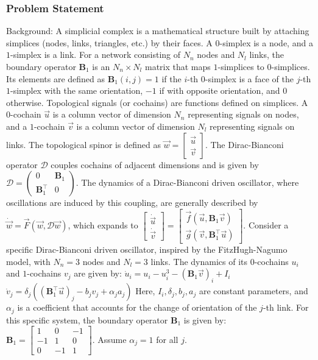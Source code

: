 \documentclass[10pt]{article}
\begin{document}
\subsubsection*{Problem Statement}
Background:
A simplicial complex is a mathematical structure built by attaching simplices (nodes, links, triangles, etc.) by their faces. A $0$-simplex is a node, and a $1$-simplex is a link. For a network consisting of $N_n$ nodes and $N_l$ links, the boundary operator $\mathbf{B}_1$ is an $N_n \times N_l$ matrix that maps $1$-simplices to $0$-simplices. Its elements are defined as $\mathbf{B}_1(i,j)=1$ if the $i$-th $0$-simplex is a face of the $j$-th $1$-simplex with the same orientation, $-1$ if with opposite orientation, and $0$ otherwise. Topological signals (or cochains) are functions defined on simplices. A $0$-cochain $\vec{u}$ is a column vector of dimension $N_n$ representing signals on nodes, and a $1$-cochain $\vec{v}$ is a column vector of dimension $N_l$ representing signals on links. The topological spinor is defined as $\vec{w}=\begin{bmatrix} \vec{u} \\ \vec{v} \end{bmatrix}$. The Dirac-Bianconi operator $\mathcal{D}$ couples cochains of adjacent dimensions and is given by $\mathcal{D} = \begin{pmatrix} 0 & \mathbf{B}_1 \\ \mathbf{B}_1^{\top} & 0 \end{pmatrix}$. The dynamics of a Dirac-Bianconi driven oscillator, where oscillations are induced by this coupling, are generally described by $\dot{\vec{w}}=\vec{F}(\vec{w},\mathcal{D}\vec{w})$, which expands to $\begin{bmatrix} \dot{\vec{u}}\\\dot{\vec{v}} \end{bmatrix}=\begin{bmatrix} \vec{f}(\vec{u},\boldsymbol{B}_1 \vec{v})\\ \vec{g}(\vec{v},\boldsymbol{B}_1^\top \vec{u}) \end{bmatrix}$.
Consider a specific Dirac-Bianconi driven oscillator, inspired by the FitzHugh-Nagumo model, with $N_n=3$ nodes and $N_l=3$ links. The dynamics of its $0$-cochains $u_i$ and $1$-cochains $v_j$ are given by:
$\dot{u}_i=u_i-u_i^3-(\boldsymbol{B}_1\vec{v})_i+I_i$
$\dot{v}_j=\delta_j((\boldsymbol{B}_1^\top\vec{u})_j-b_jv_j+\alpha_j a_j)$
Here, $I_i, \delta_j, b_j, a_j$ are constant parameters, and $\alpha_j$ is a coefficient that accounts for the change of orientation of the $j$-th link. For this specific system, the boundary operator $\boldsymbol{B}_1$ is given by:
$\boldsymbol{B}_1=\begin{bmatrix} 1 & 0 &-1 \\ -1 & 1 & 0 \\ 0 & -1 & 1 \end{bmatrix}$.
Assume $\alpha_j=1$ for all $j$.
\end{document}
